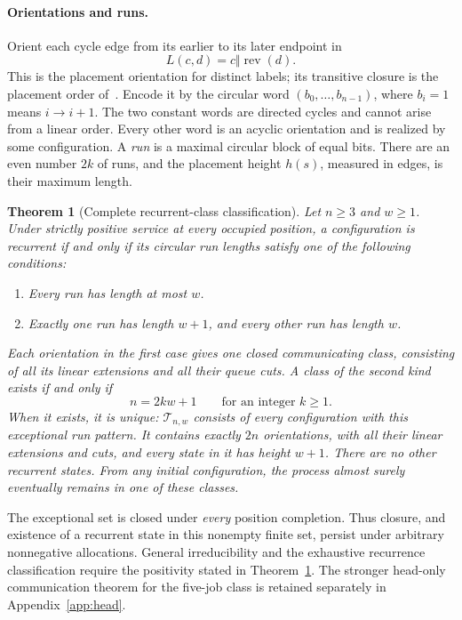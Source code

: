 \documentclass[11pt]{article}
\newtheorem{theorem}{Theorem}
\theoremstyle{remark}
\newcommand{\rev}{\operatorname{rev}}
\newcommand{\T}{\mathcal T_{n,w}}
\begin{document}
\paragraph{Orientations and runs.}
Orient each cycle edge from its earlier to its later endpoint in
\begin{equation}\label{eq:order}
 L(c,d)=c\Vert\rev(d).
\end{equation}
This is the placement orientation for distinct labels; its transitive closure is the placement order of~\cite[\S3.1, p.~216]{DG}. Encode it by the circular word $(b_0,\ldots,b_{n-1})$, where $b_i=1$ means $i\to i+1$. The two constant words are directed cycles and cannot arise from a linear order. Every other word is an acyclic orientation and is realized by some configuration. A \emph{run} is a maximal circular block of equal bits. There are an even number $2k$ of runs, and the placement height $h(s)$, measured in edges, is their maximum length.

\begin{theorem}[Complete recurrent-class classification]\label{thm:classification}
Let $n\ge3$ and $w\ge1$. Under strictly positive service at every occupied position, a configuration is recurrent if and only if its circular run lengths satisfy one of the following conditions:
\begin{enumerate}
\item Every run has length at most $w$.
\item Exactly one run has length $w+1$, and every other run has length $w$.
\end{enumerate}
Each orientation in the first case gives one closed communicating class, consisting of all its linear extensions and all their queue cuts. A class of the second kind exists if and only if
\begin{equation}\label{eq:exceptional}
 n=2kw+1\qquad\text{for an integer }k\ge1.
\end{equation}
When it exists, it is unique: $\T$ consists of every configuration with this exceptional run pattern. It contains exactly $2n$ orientations, with all their linear extensions and cuts, and every state in it has height $w+1$. There are no other recurrent states. From any initial configuration, the process almost surely eventually remains in one of these classes.
\end{theorem}

The exceptional set is closed under \emph{every} position completion. Thus closure, and existence of a recurrent state in this nonempty finite set, persist under arbitrary nonnegative allocations. General irreducibility and the exhaustive recurrence classification require the positivity stated in Theorem~\ref{thm:classification}. The stronger head-only communication theorem for the five-job class is retained separately in Appendix~\ref{app:head}.
\end{document}
